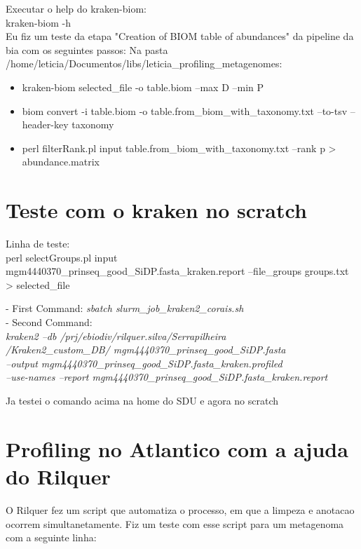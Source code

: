 \documentclass[12pt, a4paper]{report}
\begin{document}
Executar o help do kraken-biom: \\
kraken-biom -h \\

 
Eu fiz um teste da etapa "Creation of BIOM table of abundances" da pipeline da bia com os seguintes passos:
Na pasta\: 
 /home/leticia/Documentos/libs/leticia\_profiling\_metagenomes: 

\begin{itemize}
\item kraken-biom selected\_file -o table.biom --max D --min P 
\item biom convert -i table.biom -o table.from\_biom\_with\_taxonomy.txt --to-tsv --header-key taxonomy 
\item perl filterRank.pl \-\-input table.from\_biom\_with\_taxonomy.txt --rank p > abundance.matrix 
\end{itemize}

\section{Teste com o kraken no scratch}
Linha de teste: \\
perl selectGroups.pl \-\-input mgm4440370\_prinseq\_good\_SiDP.fasta\_kraken.report --file\_groups groups.txt > selected\_file


\begin{tcolorbox}[width=6.3in]
- First Command: \textit{sbatch slurm\_job\_kraken2\_corais.sh}\\
- Second Command: \textit{\\
kraken2 --db /prj/ebiodiv/rilquer.silva/Serrapilheira \\
/Kraken2\_custom\_DB/ mgm4440370\_prinseq\_good\_SiDP.fasta \\
--output mgm4440370\_prinseq\_good\_SiDP.fasta\_kraken.profiled \\
--use-names --report mgm4440370\_prinseq\_good\_SiDP.fasta\_kraken.report}
\end{tcolorbox}

Ja testei o comando acima na home do SDU e agora no scratch

\newpage
\section{Profiling no Atlantico com a ajuda do Rilquer}
O Rilquer fez um script que automatiza o processo, em que a limpeza e anotacao ocorrem simultanetamente. Fiz um teste com esse script para um metagenoma com a seguinte linha:
\end{document}
